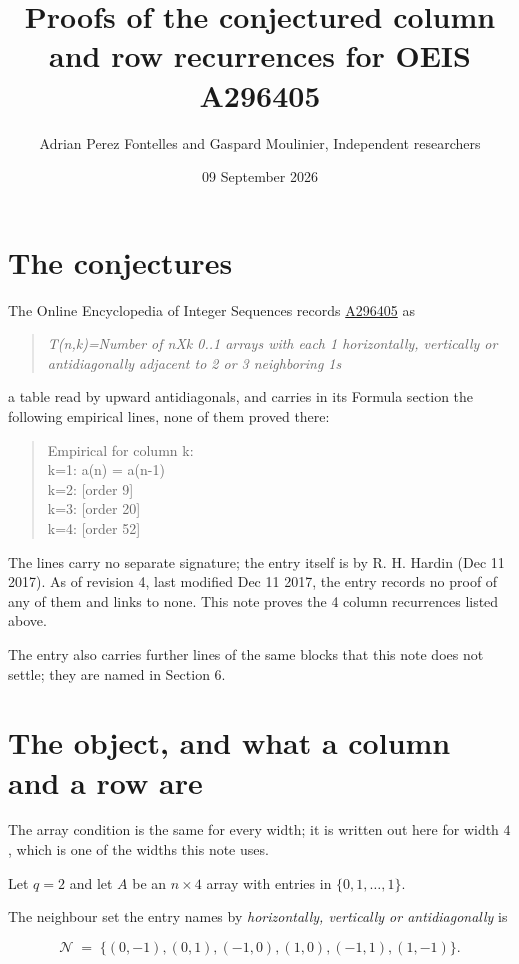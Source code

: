\documentclass[11pt]{article}
\title{Proofs of the conjectured column and row recurrences for OEIS A296405}
\author{Adrian Perez Fontelles and Gaspard Moulinier, Independent researchers}
\date{09 September 2026}
\theoremstyle{definition}
\begin{document}
\maketitle
\section{The conjectures}

The Online Encyclopedia of Integer Sequences records \href{https://oeis.org/A296405}{A296405} as

\begin{quote}\itshape T(n,k)=Number of nXk 0..1 arrays with each 1 horizontally, vertically or antidiagonally adjacent to 2 or 3 neighboring 1s\end{quote}

a table read by upward antidiagonals, and carries in its Formula section the following empirical lines, none of them proved there:

\begin{quote}\ttfamily Empirical for column k:\\
k=1: a(n) = a(n-1)\\k=2: [order 9]\\k=3: [order 20]\\k=4: [order 52]\end{quote}

The lines carry no separate signature; the entry itself is by R. H. Hardin (Dec 11 2017). As of revision 4, last modified Dec 11 2017, the entry records no proof of any of them and links to none. This note proves the 4 column recurrences listed above.

The entry also carries further lines of the same blocks that this note does not settle; they are named in Section 6.

\section{The object, and what a column and a row are}

The array condition is the same for every width; it is written out here for width $4$, which is one of the widths this note uses.

Let $q = 2$ and let $A$ be an $n \times 4$ array with entries in $\{0,1,\dots,1\}$.

The neighbour set the entry names by {\itshape horizontally, vertically or antidiagonally} is

\[\mathcal{N} \;=\; \{(0,-1), (0,1), (-1,0), (1,0), (-1,1), (1,-1)\}.\]
\end{document}
